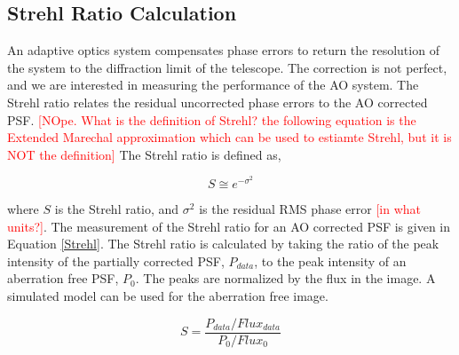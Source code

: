 \documentclass[12pt]{spieman}  %
\newcommand{\jrmcom}[1]{\textcolor{red}{[#1]}}
\begin{document}
\begin{spacing}{2}
\appendix 
\section{Strehl Ratio Calculation} \label{strehlct}

An adaptive optics system compensates phase errors to return the resolution of the system to the diffraction limit of the telescope. The correction is not perfect, and we are interested in measuring the performance of the AO system. The Strehl ratio relates the residual uncorrected phase errors to the AO corrected PSF. \jrmcom{NOpe.  What is the definition of Strehl?  the following equation is the Extended Marechal approximation which can be used to estiamte Strehl, but it is NOT the definition} The Strehl ratio is defined as, 

\begin{equation}
    S \cong e^{-\sigma^2}
\end{equation}

where $S$ is the Strehl ratio, and $\sigma^2$ is the residual RMS phase error \jrmcom{in what units?}. The measurement of the Strehl ratio for an AO corrected PSF is given in Equation \ref{Strehl}. The Strehl ratio is calculated by taking the ratio of the peak intensity of the partially corrected PSF, $P_{data}$,  to the peak intensity of an aberration free PSF, $P_0$. The peaks are normalized by the flux in the image. A simulated model can be used for the aberration free image. 

\begin{equation}
    S=\frac{P_{data}/Flux_{data}}{P_{0}/Flux_{0}}
    \label{Strehl}
\end{equation}


\end{spacing}
\end{document}
